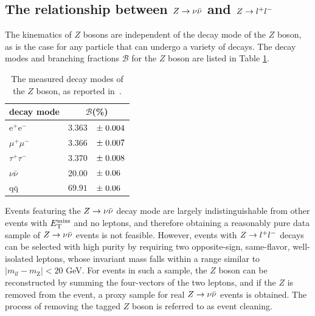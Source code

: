 \subsection{The relationship between $Z\rightarrow \nu\bar{\nu}$ and $Z\rightarrow l^+l^-$}
The kinematics of $Z$ bosons are independent of the decay mode of the $Z$ boson, as is the case for any particle that can undergo a variety of decays. The decay modes and branching fractions $\mathcal{B}$ for the $Z$ boson are listed in Table \ref{tab:zdecay}. 
\begin{table}[h]
\centering
\begin{tabular}{l|rl}
\hline
decay mode & \multicolumn{2}{c}{$\mathcal{B}$(\%)}\\
\hline
e$^+$e$^-$ & $3.363$&\hspace{-3mm}$\pm \hspace{1mm}0.004$\\
$\mu^+\mu^-$ & $3.366$&\hspace{-3mm}$\pm \hspace{1mm}0.007$\\
$\tau^+\tau^-$ & $3.370$&\hspace{-3mm}$\pm \hspace{1mm}0.008$\\
$\nu\bar{\nu}$ & $20.00$&\hspace{-3mm}$\pm \hspace{1mm}0.06$\\
q$\bar{\text{q}}$ & $69.91$&\hspace{-3mm}$\pm \hspace{1mm}0.06$\\
\hline
\end{tabular}
\caption{The measured decay modes of the $Z$ boson, as reported in~\cite{Agashe:2014kda}.}
\label{tab:zdecay}
\end{table}
Events featuring the $Z\rightarrow \nu\bar{\nu}$ decay mode are largely indistinguishable from other events with $E_{\text{T}}^{\rm miss}$ and no leptons, and therefore obtaining a reasonably pure data sample of $Z\rightarrow \nu\bar{\nu}$ events is not feasible. However, events with $Z\rightarrow l^+l^-$ decays can be selected with high purity by requiring two opposite-sign, same-flavor, well-isolated leptons, whose invariant mass falls within a range similar to $|m_{ll}-m_\text{Z}|<20$ GeV. For events in such a sample, the $Z$ boson can be reconstructed by summing the four-vectors of the two leptons, and if the $Z$ is removed from the event, a proxy sample for real $Z\rightarrow \nu\bar{\nu}$ events is obtained. The process of removing the tagged $Z$ boson is referred to as event cleaning. 

